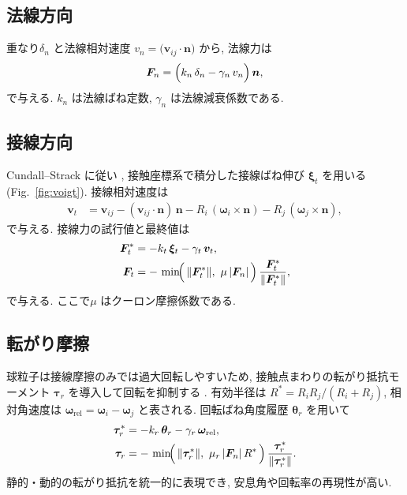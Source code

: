 \documentclass[a4paper,10pt,twocolumn]{ltjsarticle}
\newcommand{\refFig}[1]{Fig.~\ref{#1}}
\begin{document}
\subsection{法線方向}
重なり$\delta_n$ と法線相対速度 $v_n=\bigl(\bm v_{ij}\cdot\bm n\bigr)$ から, 法線力は
\begin{align}
  \bm F_n
  = \Bigl(k_n\,\delta_n - \gamma_n\, v_n \Bigr)\,\bm n ,
  \label{eq:Fn}
\end{align}
で与える. $k_n$ は法線ばね定数, $\gamma_n$ は法線減衰係数である.

\subsection{接線方向}
Cundall--Strack に従い \cite{Cundall1979}, 接触座標系で積分した接線ばね伸び $\bm\xi_t$ を用いる(\refFig{fig:voigt}). 接線相対速度は
\begin{align}
  \bm v_t & = \bm v_{ij} - (\bm v_{ij}\!\cdot\!\bm n)\,\bm n
  - R_i\,(\bm\omega_i\!\times\!\bm n)
  - R_j\,(\bm\omega_j\!\times\!\bm n),
\end{align}
で与える. 接線力の試行値と最終値は
\begin{align}
  \bm F_t^\ast & = -k_t\,\bm\xi_t - \gamma_t\,\bm v_t,                          \\
  \bm F_t      & = -\,\min\!\Bigl(\,\|\bm F_t^\ast\|,\ \mu\,|\bm F_n|\,\Bigr)\,
  \frac{\bm F_t^\ast}{\|\bm F_t^\ast\|},
  \label{eq:Ft_min}
\end{align}
で与える. ここで$\mu$ はクーロン摩擦係数である.

\subsection{転がり摩擦}
球粒子は接線摩擦のみでは過大回転しやすいため, 接触点まわりの転がり抵抗モーメント $\bm\tau_r$ を導入して回転を抑制する \cite{Iwashita1998}. 有効半径は $R^\ast=R_iR_j/(R_i+R_j)$, 相対角速度は $\bm\omega_\mathrm{rel}=\bm\omega_i-\bm\omega_j$ と表される.
回転ばね角度履歴 $\bm\theta_r$ を用いて
\begin{align}
  \bm\tau_r^\ast & = -k_r\,\bm\theta_r - \gamma_r\,\bm\omega_\mathrm{rel},                    \\
  \bm\tau_r      & = -\,\min\!\Bigl(\,\|\bm\tau_r^\ast\|,\ \mu_r\,|\bm F_n|\,R^\ast\,\Bigr)\,
  \frac{\bm\tau_r^\ast}{\|\bm\tau_r^\ast\|}.
  \label{eq:rr_min}
\end{align}
静的・動的の転がり抵抗を統一的に表現でき, 安息角や回転率の再現性が高い.
\end{document}
